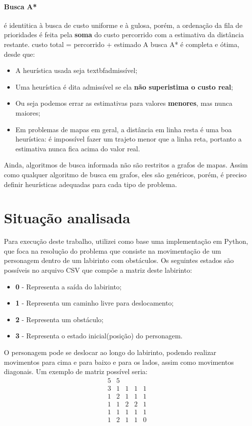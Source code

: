 \documentclass[12pt]{article}
\begin{document}
\paragraph{Busca A*} é identitica à busca de custo uniforme e à gulosa, porém, a ordenação da fila de prioridades é feita pela \textbf{soma} do custo percorrido com a estimativa da distância restante.
custo total = percorrido + estimado
A busca A* é completa e ótima, desde que:
\begin{itemize}
    \item A heurística usada seja textbf{admissível};
    \item Uma heurística é dita admissível se ela \textbf{não superistima o custo real};
    \item Ou seja podemos errar as estimativas para valores \textbf{menores}, mas nunca maiores;
    \item Em problemas de mapas em geral, a distância em linha resta é uma boa heurística: é impossível fazer um trajeto menor que a linha reta, portanto a estimativa nunca fica acima do valor real.
\end{itemize}
Ainda, algoritmos de busca informada não são restritos a grafos de mapas. Assim como qualquer algoritmo de busca em grafos, eles são genéricos, porém, é preciso definir heurísticas adequadas para cada tipo de problema.


\section{Situação analisada}

Para execução deste trabalho, utilizei como base uma implementação em Python, que foca na resolução do problema que consiste na movimentação de um personagem dentro de um labirinto com obstáculos. 
Os seguintes estados são possíveis no arquivo CSV que compõe a matriz deste labirinto:
\begin{itemize}
    \item \textbf{0} - Representa a saída do labirinto;
    \item \textbf{1} - Representa um caminho livre para deslocamento;
    \item \textbf{2} - Representa um obstáculo;
    \item \textbf{3} - Representa o estado inicial(posição) do personagem.
\end{itemize}
O personagem pode se deslocar ao longo do labirinto, podendo realizar movimentos para cima e para baixo e para os lados, assim como movimentos diagonais. Um exemplo de matriz possível seria:
\[
\begin{matrix}
5 & 5 \\
3 & 1 & 1 & 1 & 1 \\
1 & 2 & 1 & 1 & 1 \\
1 & 1 & 2 & 2 & 1 \\
1 & 1 & 1 & 1 & 1 \\
1 & 2 & 1 & 1 & 0 \\
\end{matrix}
\]
\end{document}
